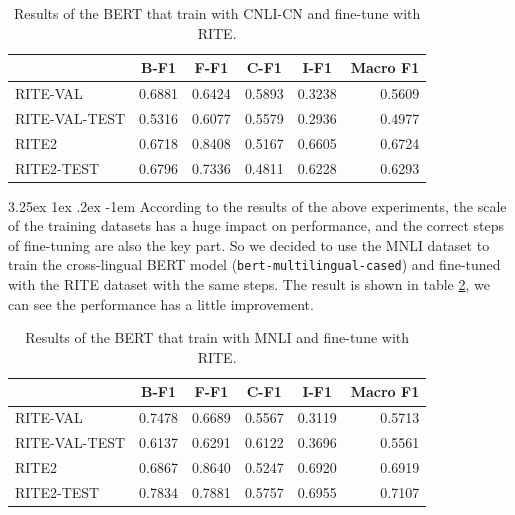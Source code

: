\documentclass[12pt]{article}
\makeatletter
\renewcommand\paragraph{\@startsection{paragraph}{5}{\z@}%
  {3.25ex \@plus1ex \@minus.2ex}%
  {-1em}%
  {\normalfont\normalsize\bfseries}}
\makeatother
\begin{document}
\begin{CJK*}{UTF8}{bkai}
\begin{spacing}{1.77}
\begin{table}[H]
  \centering
  \setlength{\extrarowheight}{-3pt}
  \begin{tabular}{|l|r|r|r|r|r|}
  \hline
   & \multicolumn{1}{c|}{B-F1} & \multicolumn{1}{c|}{F-F1} & \multicolumn{1}{c|}{C-F1} & \multicolumn{1}{c|}{I-F1} & \multicolumn{1}{c|}{Macro F1} \\ \hline
  RITE-VAL & 0.6881 & 0.6424 & 0.5893 & 0.3238 & 0.5609 \\ \hline
  RITE-VAL-TEST & 0.5316 & 0.6077 & 0.5579 & 0.2936 & 0.4977 \\ \hline
  RITE2 & 0.6718 & 0.8408 & 0.5167 & 0.6605 & 0.6724 \\ \hline
  RITE2-TEST & 0.6796 & 0.7336 & 0.4811 & 0.6228 & 0.6293 \\ \hline
  \end{tabular}
  \caption{Results of the BERT that train with CNLI-CN and fine-tune with RITE.}
  \label{result:bert_cnli_cn}
\end{table}

\paragraph{}
According to the results of the above experiments, the scale of the training datasets has a huge impact on performance, and the correct steps of fine-tuning are also the key part. So we decided to use the MNLI dataset to train the cross-lingual BERT model (\texttt{bert-multilingual-cased}) and fine-tuned with the RITE dataset with the same steps. The result is shown in table \ref{result:bert_mnli_transfer}, we can see the performance has a little improvement.

\begin{table}[H]
  \centering
  \setlength{\extrarowheight}{-3pt}
  \begin{tabular}{|l|r|r|r|r|r|}
  \hline
   & \multicolumn{1}{c|}{B-F1} & \multicolumn{1}{c|}{F-F1} & \multicolumn{1}{c|}{C-F1} & \multicolumn{1}{c|}{I-F1} & \multicolumn{1}{c|}{Macro F1} \\ \hline
  RITE-VAL & 0.7478 & 0.6689 & 0.5567 & 0.3119 & 0.5713 \\ \hline
  RITE-VAL-TEST & 0.6137 & 0.6291 & 0.6122 & 0.3696 & 0.5561 \\ \hline
  RITE2 & 0.6867 & 0.8640 & 0.5247 & 0.6920 & 0.6919 \\ \hline
  RITE2-TEST & 0.7834 & 0.7881 & 0.5757 & 0.6955 & 0.7107 \\ \hline
  \end{tabular}
  \caption{Results of the BERT that train with MNLI and fine-tune with RITE.}
  \label{result:bert_mnli_transfer}
\end{table}


\end{spacing}
\end{CJK*}
\end{document}
